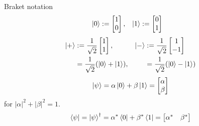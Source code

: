 \documentclass{beamer}
\begin{document}
\begin{frame}{Braket notation}
\begin{align*}
\ket{0} &:= \begin{bmatrix}1\\0\end{bmatrix},&
\ket{1} &:= \begin{bmatrix}0\\1\end{bmatrix}
\end{align*}
\begin{align*}
\ket{+} &:= \frac1{\sqrt{2}}\begin{bmatrix}1\\1\end{bmatrix},&
\ket{-} &:= \frac1{\sqrt{2}}\begin{bmatrix}1\\-1\end{bmatrix}\\
&=\frac1{\sqrt{2}}(\ket{0}+\ket{1}),&
&=\frac1{\sqrt{2}}(\ket{0}-\ket{1})
\end{align*}
\begin{align*}
\ket{\psi} = \alpha\ket{0}+\beta\ket{1}=\begin{bmatrix}\alpha\\\beta\end{bmatrix}
\end{align*}
for $|\alpha|^2+|\beta|^2=1$.
\begin{align*}
\bra{\psi} = \ket{\psi}^\dagger = \alpha^*\bra{0}+\beta^*\bra{1}=\begin{bmatrix}\alpha^*&\beta^*\end{bmatrix}
\end{align*}
\end{frame}
\end{document}
